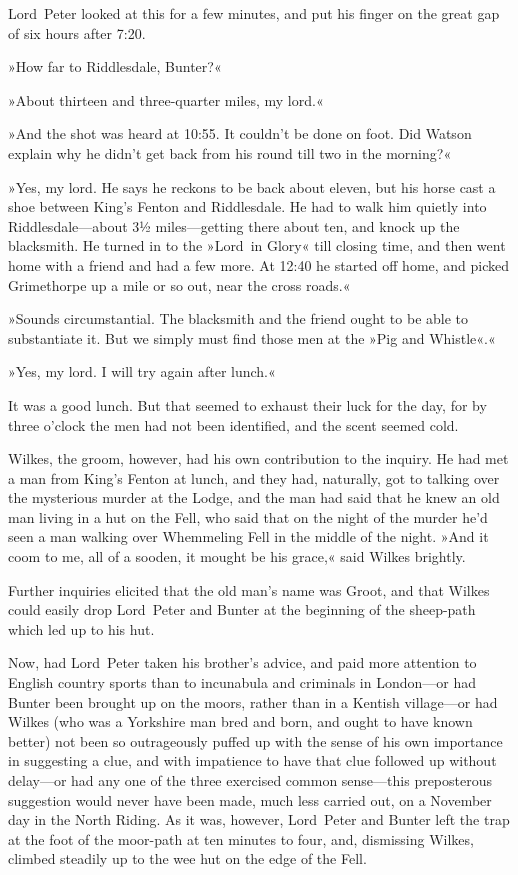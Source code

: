 Lord~Peter looked at this for a few minutes, and put his finger on the great gap of six hours after 7:20.

»How far to Riddlesdale, Bunter?«

»About thirteen and three-quarter miles, my lord.«

»And the shot was heard at 10:55. It couldn't be done on foot. Did Watson explain why he didn't get back from his round till two in the morning?«

»Yes, my lord. He says he reckons to be back about eleven, but his horse cast a shoe between King's Fenton and Riddlesdale. He had to walk him quietly into Riddlesdale—about 3½ miles—getting there about ten, and knock up the blacksmith. He turned in to the »Lord~in Glory« till closing time, and then went home with a friend and had a few more. At 12:40 he started off home, and picked Grimethorpe up a mile or so out, near the cross roads.«

»Sounds circumstantial. The blacksmith and the friend ought to be able to substantiate it. But we simply must find those men at the »Pig and Whistle«.«

»Yes, my lord. I will try again after lunch.«

It was a good lunch. But that seemed to exhaust their luck for the day, for by three o'clock the men had not been identified, and the scent seemed cold.

Wilkes, the groom, however, had his own contribution to the inquiry. He had met a man from King's Fenton at lunch, and they had, naturally, got to talking over the mysterious murder at the Lodge, and the man had said that he knew an old man living in a hut on the Fell, who said that on the night of the murder he'd seen a man walking over Whemmeling Fell in the middle of the night. »And it coom to me, all of a sooden, it mought be his grace,« said Wilkes brightly.

Further inquiries elicited that the old man's name was Groot, and that Wilkes could easily drop Lord~Peter and Bunter at the beginning of the sheep-path which led up to his hut.

Now, had Lord~Peter taken his brother's advice, and paid more attention to English country sports than to incunabula and criminals in London—or had Bunter been brought up on the moors, rather than in a Kentish village—or had Wilkes (who was a Yorkshire man bred and born, and ought to have known better) not been so outrageously puffed up with the sense of his own importance in suggesting a clue, and with impatience to have that clue followed up without delay—or had any one of the three exercised common sense—this preposterous suggestion would never have been made, much less carried out, on a November day in the North Riding. As it was, however, Lord~Peter and Bunter left the trap at the foot of the moor-path at ten minutes to four, and, dismissing Wilkes, climbed steadily up to the wee hut on the edge of the Fell.


